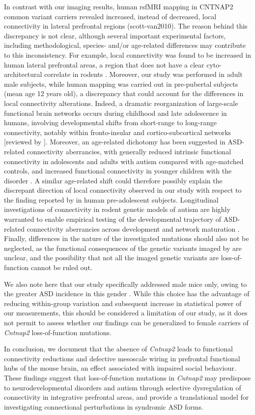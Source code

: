 In contrast with our imaging results, human rsfMRI mapping in CNTNAP2 common
variant carriers revealed increased, instead of decreased, local connectivity in
lateral prefrontal regions (scott-van2010). The reason behind this discrepancy
is not clear, although several important experimental factors, including
methodological, species- and/or age-related differences may contribute to this
inconsistency. For example, local connectivity was found to be increased in
human lateral prefrontal areas, a region that does not have a clear
cyto-architectural correlate in rodents \parencite{vogt2014}. Moreover, our
study was performed in adult male subjects, while human mapping was carried out
in pre-pubertal subjects (mean age 12 years old), a discrepancy that could
account for the differences in local connectivity alterations. Indeed, a
dramatic reorganization of large-scale functional brain networks occurs during
childhood and late adolescence in humans, involving developmental shifts from
short-range to long-range connectivity, notably within fronto-insular and
cortico-subcortical networks [reviewed by \parencite{ernst2015}]. Moreover, an
age-related dichotomy has been suggested in ASD-related connectivity
aberrancies, with generally reduced intrinsic functional connectivity in
adolescents and adults with autism compared with age-matched controls, and
increased functional connectivity in younger children with the disorder
\parencite{uddin2013}. A similar age-related shift could therefore possibly
explain the discrepant direction of local connectivity observed in our study
with respect to the finding reported by \textcite{scott-vanzeeland2010} in
human pre-adolescent subjects. Longitudinal investigations of connectivity in
rodent genetic models of autism are highly warranted to enable empirical testing
of the developmental trajectory of ASD-related connectivity aberrancies across
development and network maturation \parencite{liska2016}. Finally, differences
in the nature of the investigated mutations should also not be neglected, as
the functional consequences of the genetic variants imaged by
\textcite{scott-vanzeeland2010} are unclear, and the possibility that not all
the imaged genetic variants are loss-of-function cannot be ruled out. 

We also note here that our study specifically addressed male mice only, owing to
the greater ASD incidence in this gender \parencite{lai2015}. While this choice
has the advantage of reducing within-group variation and subsequent increase in
statistical power of our measurements, this should be considered a limitation of
our study, as it does not permit to assess whether our findings can be
generalized to female carriers of \textit{Cntnap2} loss-of-function mutations. 

In conclusion, we document that the absence of \textit{Cntnap2} leads to functional
connectivity reductions and defective mesoscale wiring in prefrontal functional
hubs of the mouse brain, an effect associated with impaired social behaviour.
These findings suggest that loss-of-function mutations in \textit{Cntnap2} may predispose
to neurodevelopmental disorders and autism through selective dysregulation of
connectivity in integrative prefrontal areas, and provide a translational model
for investigating connectional perturbations in syndromic ASD forms.
